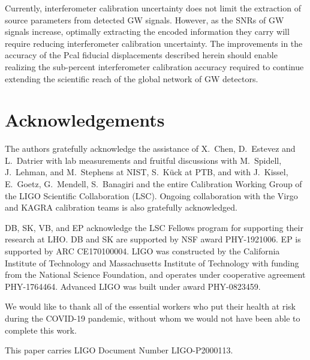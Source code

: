 \documentclass[12pt,a4paper,final]{iopart}
\begin{document}
Currently, interferometer calibration uncertainty does not limit the extraction of source parameters from detected GW signals. However, as the SNRs of GW signals increase, optimally extracting the encoded information they carry  will require reducing interferometer calibration uncertainty.   The improvements in the accuracy of the Pcal fiducial displacements described herein should enable realizing the sub-percent interferometer calibration accuracy required to continue extending the scientific reach of the global network of GW detectors.

%
\section{Acknowledgements}
%
The authors gratefully acknowledge the assistance of X.~Chen, D.~Estevez and L.~Datrier with lab measurements and fruitful discussions with M.~Spidell, J.~Lehman, and M.~Stephens at NIST, S.~K\"{u}ck at PTB,  and with J.~Kissel, E.~Goetz, G.~Mendell, S.~Banagiri and the entire Calibration Working Group of the LIGO Scientific Collaboration (LSC).  Ongoing collaboration with the Virgo and KAGRA calibration teams is also gratefully acknowledged.

DB, SK, VB, and EP acknowledge the LSC Fellows program for supporting their research at LHO.  DB and SK are supported by NSF award PHY-1921006. EP is supported by ARC CE170100004.
LIGO was constructed by the California Institute of Technology and Massachusetts Institute of Technology with funding from the National Science Foundation, and operates under cooperative agreement PHY-1764464. Advanced LIGO was built under award PHY-0823459. 

We would like to thank all of the essential workers who put their health at risk during the COVID-19 pandemic, without whom we would not have been able to complete this work.
 
This paper carries LIGO Document Number LIGO-P2000113.

%
\newpage
%
\end{document}
